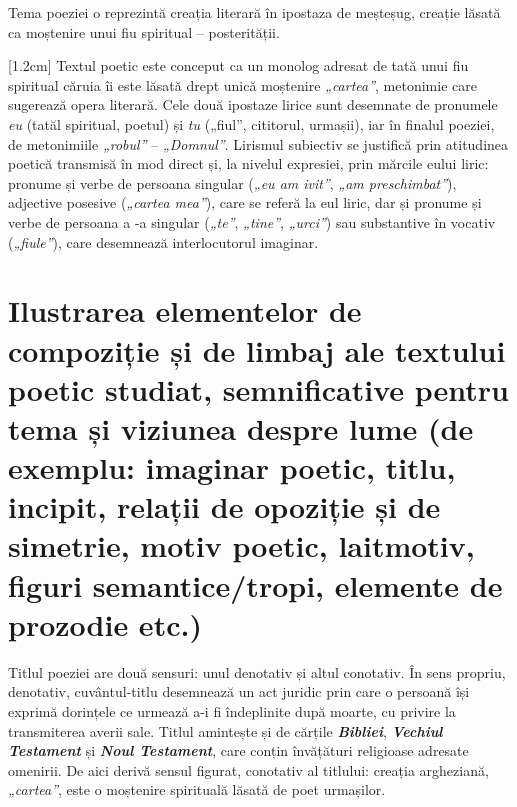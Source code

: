 \documentclass[
12pt,
a4paper
]{article}
\newcommand{\rom}[1]{\uppercase\expandafter{\romannumeral #1\relax}} %
\newcommand{\operatitle}{\textbf{\textit{„Testament”\ }}} %
\begin{document}
Tema poeziei o reprezintă creația literară în ipostaza de meșteșug, creație lăsată ca moștenire unui fiu spiritual -- posterității.

[1.2cm]
Textul poetic este conceput ca un monolog adresat de tată unui fiu spiritual căruia îi este lăsată drept unică moștenire \textit{„cartea”}, metonimie care sugerează opera literară. Cele două ipostaze lirice sunt desemnate de pronumele \textit{eu} (tatăl spiritual, poetul) și \textit{tu} („fiul”, cititorul, urmașii), iar în finalul poeziei, de metonimiile \textit{„robul”} -- \textit{„Domnul”}. Lirismul subiectiv se justifică prin atitudinea poetică transmisă în mod direct și, la nivelul expresiei, prin mărcile eului liric: pronume și verbe de persoana \rom{1} singular (\textit{„eu am ivit”}, \textit{„am preschimbat”}), adjective posesive (\textit{„cartea mea”}), care se referă la eul liric, dar și pronume și verbe de persoana a \rom{2}-a singular (\textit{„te”}, \textit{„tine”}, \textit{„urci”}) sau substantive în vocativ (\textit{„fiule”}), care desemnează interlocutorul imaginar.




\section{Ilustrarea elementelor de compoziție și de limbaj ale textului poetic studiat, semnificative pentru tema și viziunea despre lume {\footnotesize (de exemplu: imaginar poetic, titlu, incipit, relații de opoziție și de simetrie, motiv poetic, laitmotiv, figuri semantice/tropi, elemente de prozodie etc.)}}

Titlul poeziei are două sensuri: unul denotativ și altul conotativ. În sens propriu, denotativ, cuvântul-titlu desemnează un act juridic prin care o persoană își exprimă dorințele ce urmează a-i fi îndeplinite după moarte, cu privire la transmiterea averii sale. Titlul amintește și de cărțile \textbf{\textit{Bibliei}}, \textbf{\textit{Vechiul Testament}} și \textbf{\textit{Noul Testament}}, care conțin învățături religioase adresate omenirii. De aici derivă sensul figurat, conotativ al titlului: creația argheziană, \textit{„cartea”}, este o moștenire spirituală lăsată de poet urmașilor.
\end{document}
